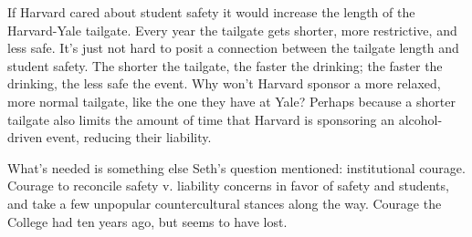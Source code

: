 If Harvard cared about student safety it would increase the length of the
Harvard-Yale tailgate. Every year the tailgate gets shorter, more
restrictive, and less safe. It's just not hard to posit a connection between
the tailgate length and student safety. The shorter the tailgate, the faster
the drinking; the faster the drinking, the less safe the event. Why won't
Harvard sponsor a more relaxed, more normal tailgate, like the one they have
at Yale? Perhaps because a shorter tailgate also limits the amount of time
that Harvard is sponsoring an alcohol-driven event, reducing their liability.

What's needed is something else Seth's question mentioned: institutional
courage. Courage to reconcile safety v. liability concerns in favor of safety
and students, and take a few unpopular countercultural stances along the way.
Courage the College had ten years ago, but seems to have lost.

